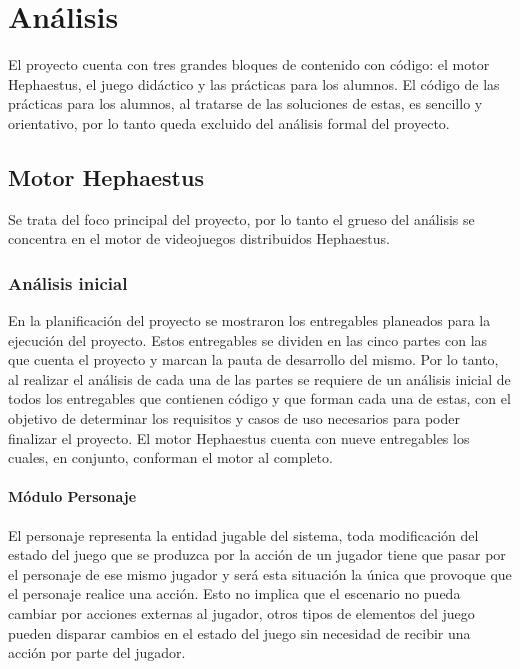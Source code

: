 \chapter{Análisis}\label{Cap4}

El proyecto cuenta con tres grandes bloques de contenido con código: el motor Hephaestus, el juego didáctico y las prácticas para los alumnos. El código de las prácticas para los alumnos, al tratarse de las soluciones de estas, es sencillo y orientativo, por lo tanto queda excluido del análisis formal del proyecto.

\section{Motor Hephaestus}

Se trata del foco principal del proyecto, por lo tanto el grueso del análisis se concentra en el motor de videojuegos distribuidos Hephaestus.

\subsection{Análisis inicial}

En la planificación del proyecto se mostraron los entregables planeados para la ejecución del proyecto. Estos entregables se dividen en las cinco partes con las que cuenta el proyecto y marcan la pauta de desarrollo del mismo. Por lo tanto, al realizar el análisis de cada una de las partes se requiere de un análisis inicial de todos los entregables que contienen código y que forman cada una de estas, con el objetivo de determinar los requisitos y casos de uso necesarios para poder finalizar el proyecto. El motor Hephaestus cuenta con nueve entregables los cuales, en conjunto, conforman el motor al completo.

\subsubsection{Módulo Personaje}

El personaje representa la entidad jugable del sistema, toda modificación del estado del juego que se produzca por la acción de un jugador tiene que pasar por el personaje de ese mismo jugador y será esta situación la única que provoque que el personaje realice una acción. Esto no implica que el escenario no pueda cambiar por acciones externas al jugador, otros tipos de elementos del juego pueden disparar cambios en el estado del juego sin necesidad de recibir una acción por parte del jugador.

